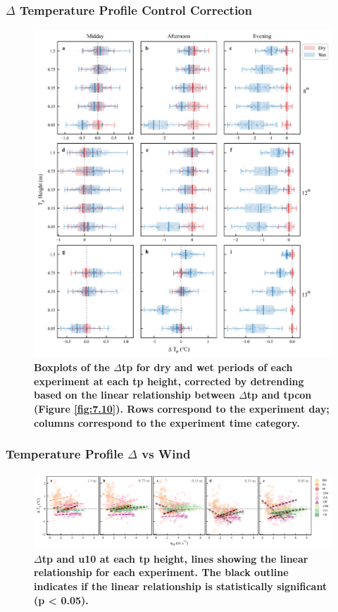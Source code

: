\documentclass[final,3p,times,authoryear]{elsarticle}
\begin{document}
{\subsubsection{$\Delta$ Temperature Profile Control Correction}\label{sec:appendix7.5.3}
\begin{figure}
\centering
\includegraphics[trim={0 0 0 0},clip,scale=1.0]{pict040.png}
\caption{\bf Boxplots of the $\Delta$\gls{tp} for dry and wet periods of each experiment at each \gls{tp} height, corrected
by detrending based on the linear relationship between $\Delta$\gls{tp} and \gls{tpcon} (Figure \ref{fig:7.10}). Rows correspond to
the experiment day; columns correspond to the experiment time category.}
 \label{fig:7.11}
\end{figure}

\subsubsection{Temperature Profile $\Delta$ vs Wind}\label{sec:appendix7.5.4}

\begin{figure}
\centering
\includegraphics[trim={0 0 0 0},clip,scale=1.0]{pict041.png}
\caption{\bf $\Delta$\gls{tp} and \gls{u10} at each \gls{tp} height, lines showing the linear relationship for each experiment. The
black outline indicates if the linear relationship is statistically significant (p < 0.05).}
 \label{fig:7.12}
\end{figure}


}
\end{document}
